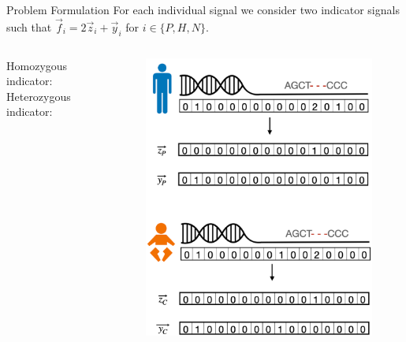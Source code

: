 \documentclass[10pt, t]{beamer}
\begin{document}
\begin{frame}{Problem Formulation}
    For each individual signal we consider two indicator signals such that $\vec{f}_i = 2\vec{z}_i + \vec{y}_i$ for $i \in \{P, H, N\}$. \ %
{\begin{center}
	\begin{columns}
		\begin{column}{0.3\textwidth}
		Homozygous indicator: 
			\vspace{3mm}
		Heterozygous indicator: 
			\vspace{5mm}
		\end{column}
		\hspace{20mm}
		\begin{column}{0.5\textwidth}
			\vspace{-5mm}
			\begin{figure}
				\includegraphics[width=.8\linewidth]{imgs/indicator_vecs.png}
			\end{figure}
		\end{column}
	\end{columns}
	\end{center}}
\end{frame}
\end{document}

